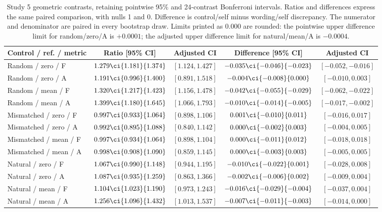 \begin{table}[H]
\centering\footnotesize
\setlength{\tabcolsep}{3pt}
\caption{Study 5 geometric contrasts, retaining pointwise 95\% and 24-contrast Bonferroni intervals. Ratios and differences express the same paired comparison, with nulls 1 and 0. Difference is control/self minus wording/self discrepancy. The numerator and denominator are paired in every bootstrap draw. Limits printed as 0.000 are rounded: the pointwise upper difference limit for random/zero/A is $+0.0001$; the adjusted upper difference limit for natural/mean/A is $-0.0004$.}
\label{tab:null-contrasts}
\begin{tabular}{@{}lcccc@{}}
\toprule
Control / ref. / metric & Ratio [95\% CI] & Adjusted CI & Difference [95\% CI] & Adjusted CI \\
\midrule
Random / zero / F & $1.279\ci{1.181}{1.374}$ & $[1.124, 1.427]$ & $-0.035\ci{-0.046}{-0.023}$ & $[-0.052, -0.016]$ \\
Random / zero / A & $1.191\ci{0.996}{1.400}$ & $[0.891, 1.518]$ & $-0.004\ci{-0.008}{0.000}$ & $[-0.010, 0.003]$ \\
Random / mean / F & $1.320\ci{1.217}{1.423}$ & $[1.156, 1.478]$ & $-0.042\ci{-0.055}{-0.029}$ & $[-0.062, -0.022]$ \\
Random / mean / A & $1.399\ci{1.180}{1.645}$ & $[1.066, 1.793]$ & $-0.010\ci{-0.014}{-0.005}$ & $[-0.017, -0.002]$ \\
Mismatched / zero / F & $0.997\ci{0.933}{1.064}$ & $[0.898, 1.106]$ & $0.001\ci{-0.010}{0.011}$ & $[-0.016, 0.017]$ \\
Mismatched / zero / A & $0.992\ci{0.895}{1.088}$ & $[0.840, 1.142]$ & $0.000\ci{-0.002}{0.003}$ & $[-0.004, 0.005]$ \\
Mismatched / mean / F & $0.997\ci{0.934}{1.064}$ & $[0.898, 1.104]$ & $0.000\ci{-0.011}{0.012}$ & $[-0.018, 0.018]$ \\
Mismatched / mean / A & $0.998\ci{0.908}{1.090}$ & $[0.859, 1.145]$ & $0.000\ci{-0.003}{0.003}$ & $[-0.005, 0.005]$ \\
Natural / zero / F & $1.067\ci{0.990}{1.148}$ & $[0.944, 1.195]$ & $-0.010\ci{-0.022}{0.001}$ & $[-0.028, 0.008]$ \\
Natural / zero / A & $1.087\ci{0.935}{1.259}$ & $[0.863, 1.366]$ & $-0.002\ci{-0.006}{0.002}$ & $[-0.009, 0.004]$ \\
Natural / mean / F & $1.104\ci{1.023}{1.190}$ & $[0.973, 1.243]$ & $-0.016\ci{-0.029}{-0.004}$ & $[-0.037, 0.004]$ \\
Natural / mean / A & $1.256\ci{1.096}{1.432}$ & $[1.013, 1.537]$ & $-0.007\ci{-0.011}{-0.003}$ & $[-0.014, 0.000]$ \\
\bottomrule
\end{tabular}
\end{table}


